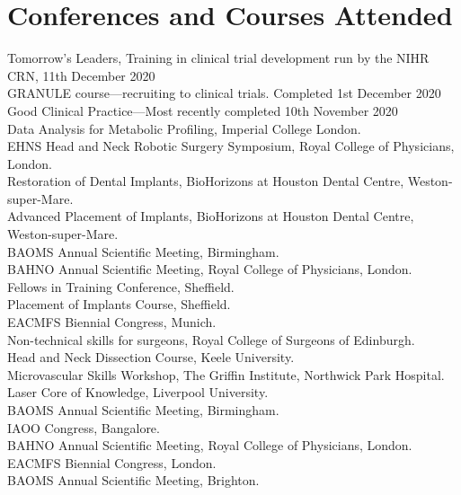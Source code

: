 \section*{Conferences and Courses Attended}

 Tomorrow's Leaders, Training in clinical trial development run by the NIHR CRN, 11th December 2020 \\ 
 GRANULE course---recruiting to clinical trials. Completed 1st December 2020 \\
 Good Clinical Practice---Most recently completed 10th November 2020 \\
 Data Analysis for Metabolic Profiling, Imperial College London. \\
 EHNS Head and Neck Robotic Surgery Symposium, Royal College of Physicians, London. \\
 Restoration of Dental Implants, BioHorizons at Houston Dental Centre,  Weston-super-Mare. \\
 Advanced Placement of Implants, BioHorizons at Houston Dental Centre,  Weston-super-Mare. \\
 BAOMS Annual Scientific Meeting, Birmingham. \\
 BAHNO Annual Scientific Meeting, Royal College of Physicians, London. \\
 Fellows in Training Conference,  Sheffield. \\
 Placement of Implants Course, Sheffield. \\
 EACMFS Biennial Congress, Munich. \\
 Non-technical skills for surgeons, Royal College of Surgeons of Edinburgh. \\
 Head and Neck Dissection Course, Keele University. \\
 Microvascular Skills Workshop, The Griffin Institute, Northwick Park Hospital. \\
 Laser Core of Knowledge, Liverpool University. \\
 BAOMS Annual Scientific Meeting, Birmingham. \\
 IAOO Congress, Bangalore. \\
 BAHNO Annual Scientific Meeting, Royal College of Physicians, London. \\
 EACMFS Biennial Congress, London. \\
 BAOMS Annual Scientific Meeting, Brighton. \\
